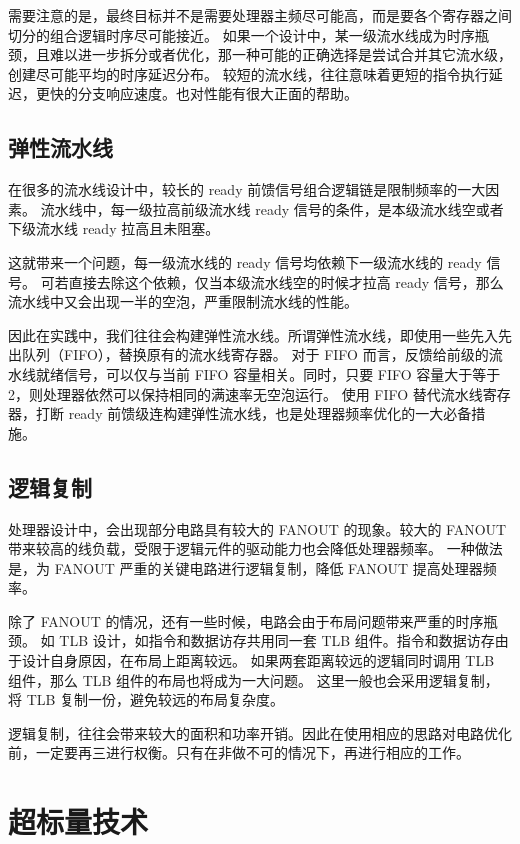 需要注意的是，最终目标并不是需要处理器主频尽可能高，而是要各个寄存器之间切分的组合逻辑时序尽可能接近。
如果一个设计中，某一级流水线成为时序瓶颈，且难以进一步拆分或者优化，那一种可能的正确选择是尝试合并其它流水级，创建尽可能平均的时序延迟分布。
较短的流水线，往往意味着更短的指令执行延迟，更快的分支响应速度。也对性能有很大正面的帮助。

\subsection{弹性流水线}\label{sec:11-advanced-cpu-004}

在很多的流水线设计中，较长的 ready 前馈信号组合逻辑链是限制频率的一大因素。
流水线中，每一级拉高前级流水线 ready 信号的条件，是本级流水线空或者下级流水线 ready 拉高且未阻塞。

这就带来一个问题，每一级流水线的 ready 信号均依赖下一级流水线的 ready 信号。
可若直接去除这个依赖，仅当本级流水线空的时候才拉高 ready 信号，那么流水线中又会出现一半的空泡，严重限制流水线的性能。

因此在实践中，我们往往会构建弹性流水线。所谓弹性流水线，即使用一些先入先出队列（FIFO），替换原有的流水线寄存器。
对于 FIFO 而言，反馈给前级的流水线就绪信号，可以仅与当前 FIFO 容量相关。同时，只要 FIFO 容量大于等于 2，则处理器依然可以保持相同的满速率无空泡运行。
使用 FIFO 替代流水线寄存器，打断 ready 前馈级连构建弹性流水线，也是处理器频率优化的一大必备措施。

\subsection{逻辑复制}\label{sec:11-advanced-cpu-005}

处理器设计中，会出现部分电路具有较大的 FANOUT 的现象。较大的 FANOUT 带来较高的线负载，受限于逻辑元件的驱动能力也会降低处理器频率。
一种做法是，为 FANOUT 严重的关键电路进行逻辑复制，降低 FANOUT 提高处理器频率。

除了 FANOUT 的情况，还有一些时候，电路会由于布局问题带来严重的时序瓶颈。
如 TLB 设计，如指令和数据访存共用同一套 TLB 组件。指令和数据访存由于设计自身原因，在布局上距离较远。
如果两套距离较远的逻辑同时调用 TLB 组件，那么 TLB 组件的布局也将成为一大问题。
这里一般也会采用逻辑复制，将 TLB 复制一份，避免较远的布局复杂度。

逻辑复制，往往会带来较大的面积和功率开销。因此在使用相应的思路对电路优化前，一定要再三进行权衡。只有在非做不可的情况下，再进行相应的工作。

\section{超标量技术}\label{sec:11-advanced-cpu-006}

